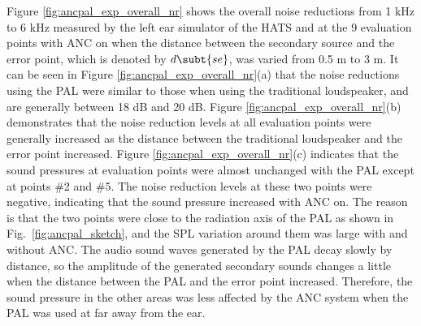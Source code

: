 Figure \ref{fig:ancpal_exp_overall_nr} shows the overall noise reductions from 1 kHz to 6 kHz measured by the left ear simulator of the HATS and at the 9 evaluation points with ANC on when the distance between the secondary source and the error point, which is denoted by $d\subt{se}$, was varied from 0.5 m to 3 m. 
It can be seen in Figure \ref{fig:ancpal_exp_overall_nr}(a) that the noise reductions using the PAL were similar to those when using the traditional loudspeaker, 
and are generally between 18 dB and 20 dB. 
Figure \ref{fig:ancpal_exp_overall_nr}(b) demonstrates that the noise reduction levels at all evaluation points were generally increased as the distance between the traditional loudspeaker and the error point increased. 
Figure \ref{fig:ancpal_exp_overall_nr}(c) indicates that the sound pressures at evaluation points were almost unchanged with the PAL except at points \#2 and \#5. 
The noise reduction levels at these two points were negative, indicating that the sound pressure increased with ANC on. 
The reason is that the two points were close to the radiation axis of the PAL as shown in Fig.~\ref{fig:ancpal_sketch}, and the SPL variation around them was large with and without ANC. 
The audio sound waves generated by the PAL decay slowly by distance, so the amplitude of the generated secondary sounds changes a little when the distance between the PAL and the error point increased. 
Therefore, the sound pressure in the other areas was less affected by the ANC system when the PAL was used at far away from the ear. 

